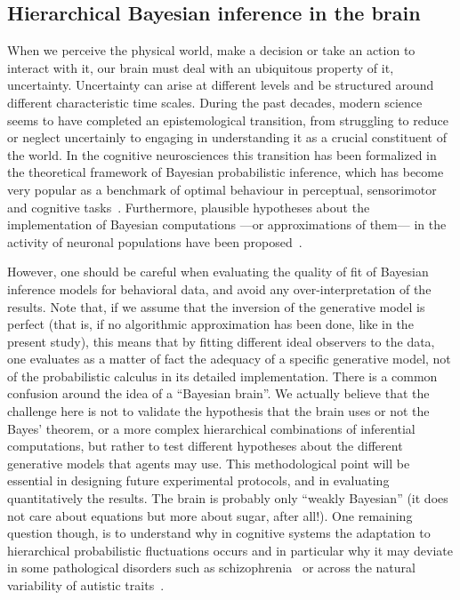 \documentclass[12pt,english]{article}%
\newcommand{\citep}[1]{\parencite{#1}}
\begin{document}
\subsection{Hierarchical Bayesian inference in the brain}
When we perceive the physical world, make a decision or take an action to interact with it,
our brain must deal with an ubiquitous property of it, uncertainty. Uncertainty can arise at different levels and be structured around different characteristic time scales. During the past decades, modern science seems to have completed an epistemological transition, from struggling to reduce or neglect uncertainly to engaging in understanding it as a crucial constituent of the world. In the cognitive neurosciences
this transition has been formalized in the theoretical framework of Bayesian probabilistic inference, which has become very popular as a
benchmark of optimal behaviour in perceptual, sensorimotor and cognitive tasks~\citep{KnillPouget2004}. Furthermore, plausible hypotheses about the implementation of Bayesian computations ---or approximations of them--- in the activity of neuronal
populations have been proposed~\citep{Bastos12, Fetsch2012,Ma2006}. 

However, one should be careful when evaluating the quality of fit of Bayesian inference models for behavioral data, and avoid any over-interpretation of the results.
Note that, if we assume that the inversion of the generative model is perfect
(that is, if no algorithmic approximation has been done, like in the present study),
this means that by fitting different ideal observers
to the data, one evaluates as a matter of fact the adequacy of
a specific generative model, not of the probabilistic calculus in its detailed implementation.
There is a common confusion around the idea of a ``Bayesian brain''.
We actually believe that the challenge here is not to validate the hypothesis that the brain uses or not the Bayes' theorem, or a more complex hierarchical combinations of inferential computations, but rather to test different hypotheses about the different generative models
that agents may use. This methodological point will be essential in designing future experimental protocols, and in evaluating quantitatively the results. The brain is probably only ``weakly Bayesian'' (it does not care about equations but more about sugar, after all!). One remaining question though, is to understand why in cognitive systems the adaptation to hierarchical probabilistic fluctuations occurs and in particular why it may deviate in some pathological disorders such as schizophrenia~\citep{Adams12, Jardri2017} or across the natural variability of autistic traits~\citep{Karvelis2018}.
\end{document}

